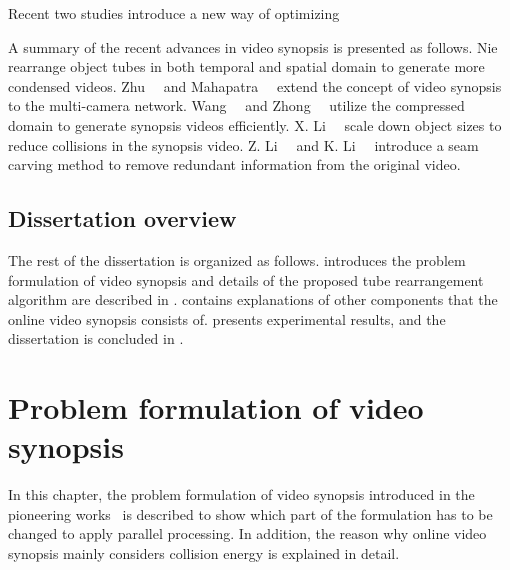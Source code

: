 \documentclass[11pt]{hyu_thesis}
\begin{document}
Recent two studies introduce a new way of optimizing 

A summary of the recent advances in video synopsis is presented as follows. Nie~\etal~\cite{Nie2014} rearrange object tubes in both temporal and spatial domain to generate more condensed videos. Zhu~\etal~\cite{Zhu2014} and Mahapatra~\etal~\cite{Mahapatra2016} extend the concept of video synopsis to the multi-camera network. Wang~\etal~\cite{Wang2013} and Zhong~\etal~\cite{RuiZhong2014} utilize the compressed domain to generate synopsis videos efficiently. X. Li~\etal~\cite{Li2016a} scale down object sizes to reduce collisions in the synopsis video. Z. Li~\etal~\cite{ZhuangLi2009} and K. Li~\etal~\cite{Li2016} introduce a seam carving method to remove redundant information from the original video.

\section{Dissertation overview}
\label{sec:intro:overview}
The rest of the dissertation is organized as follows.  introduces the problem formulation of video synopsis and details of the proposed tube rearrangement algorithm are described in .  contains explanations of other components that the online video synopsis consists of.  presents experimental results, and the dissertation is concluded in .

\chapter{Problem formulation of video synopsis}
\label{sec:basic_form}

In this chapter, the problem formulation of video synopsis introduced in the pioneering works~\cite{Rav-Acha2006,Pritch2007,Pritch2008} is described to show which part of the formulation has to be changed to apply parallel processing. In addition, the reason why online video synopsis mainly considers collision energy is explained in detail.
\end{document}
